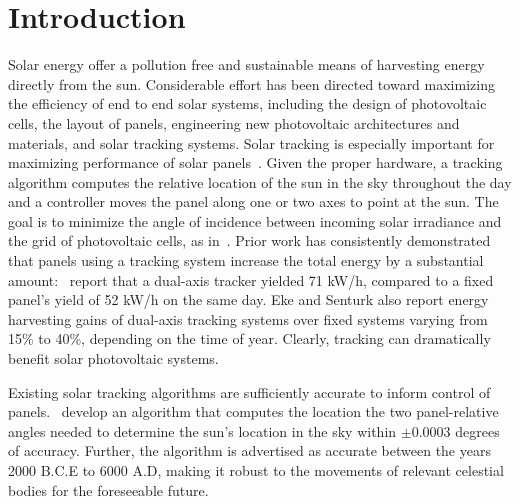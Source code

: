 \documentclass[11pt]{article}
\begin{document}
\section{Introduction}
Solar energy offer a pollution free and sustainable means of harvesting energy directly from the sun. Considerable effort has been directed toward maximizing the efficiency of end to end solar systems, including the design of photovoltaic cells, the layout of panels, engineering new photovoltaic architectures and materials, and solar tracking systems. Solar tracking is especially important for maximizing performance of solar panels~\cite{Eke2012,Rizk2008,King2001}. Given the proper hardware, a tracking algorithm computes the relative location of the sun in the sky throughout the day and a controller moves the panel along one or two axes to point at the sun. The goal is to minimize the angle of incidence between incoming solar irradiance and the grid of photovoltaic cells, as in~\citet{Eke2012,Benghanem2011,King2001, kalogirou1996design}. Prior work has consistently demonstrated that panels using a tracking system increase the total energy by a substantial amount:~\citet{Eke2012} report that a dual-axis tracker yielded 71 kW/h, compared to a fixed panel's yield of 52 kW/h on the same day. Eke and Senturk also report energy harvesting gains of dual-axis tracking systems over fixed systems varying from 15\% to 40\%, depending on the time of year. Clearly, tracking can dramatically benefit solar photovoltaic systems.

Existing solar tracking algorithms are sufficiently accurate to inform control of panels.~\citet{reda2004solar} develop an algorithm that computes the location the two panel-relative angles needed to determine the sun's location in the sky within $\pm 0.0003$ degrees of accuracy. Further, the algorithm is advertised as accurate between the years 2000 B.C.E to 6000 A.D, making it robust to the movements of relevant celestial bodies for the foreseeable future.
\end{document}
